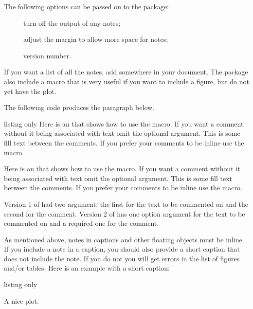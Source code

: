 The following options can be passed on to the  package:
\begin{description}
\item[\OptionTFT] turn off the output of any notes;
\item[\OptionTFT] adjust the margin to allow more space for notes;
\item[] version number.
\end{description}

If you want a list of all the notes,
add  somewhere in your document.
The  package also include a macro 
that is very useful if you want to include a figure, but do not yet have the plot.

The following code produces the paragraph below.
\begin{tcblisting}{listing only}
Here is an 
that shows how to use the macro. If you want a comment
without it being associated with text omit the optional argument.
This is some fill text between the comments.
If you prefer your comments to be inline use the  macro.
\end{tcblisting}
Here is an 
that shows how to use the macro. If you want a comment
without it being associated with text omit the optional argument.
This is some fill text between the comments.
If you prefer your comments to be inline use the  macro.

 Version 1 of  had two argument:
the first for the text to be commented on and the second for the comment.
 Version 2 of  has one option argument
for the text to be commented on and a required one for the comment.

As mentioned above, notes in captions and other floating objects must be inline.
If you include a note in a caption,
you should also provide a short caption that does not include the note.
If you do not you will get errors in the list of figures and/or tables.
Here is an example with a short caption:
\begin{tcblisting}{listing only}
\caption[A nice plot.]{A nice plot. }
\end{tcblisting}

